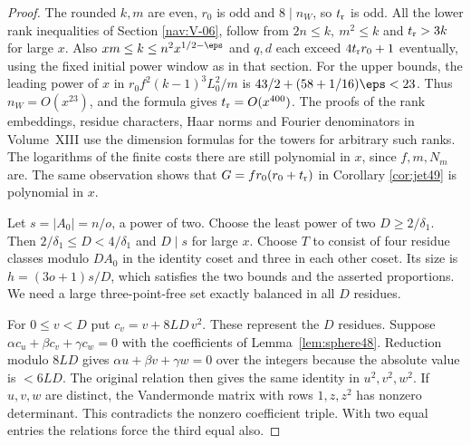 \documentclass[a4paper,11pt]{article}
\theoremstyle{definition}
\theoremstyle{remark}
\numberwithin{equation}{section}
\begin{document}
\begin{proof}
The rounded \(k,m\) are even, \(r_0\) is odd and \(8\mid n_W\), so
\(t_{\rm r}\) is odd. All the lower rank inequalities of Section \ref{nav:V-06}, follow from \(2n\le k,\ m^2\le k\) and
\(t_{\rm r}>3k\) for large \(x\). Also
\(xm\le k\le n^2x^{1/2-\eps}\) and \(q,d\) each exceed
\(4t_{\rm r}r_0+1\) eventually, using the fixed initial power window
as in that section. For the upper bounds, the leading power of \(x\)
in \(r_0 f^2(k-1)^3L_0^2/m\) is
\(43/2+(58+1/16)\eps<23\). Thus \(n_W=O(x^{23})\), and the
formula gives \(t_{\rm r}=O(x^{400})\). The proofs of the rank
embeddings, residue characters, Haar norms and Fourier denominators
in Volume~XIII use the dimension formulas for the towers for arbitrary
such ranks. The logarithms of the finite costs there are still
polynomial in \(x\), since \(f,m,N_m\) are. The same observation shows
that \(G=f r_0(r_0+t_{\rm r})\) in
Corollary \ref{cor:jet49}
is polynomial in \(x\).

Let \(s=|A_0|=n/o\), a power of two. Choose the least power of two
\(D\ge2/\delta_1\). Then \(2/\delta_1\le D<4/\delta_1\) and \(D\mid s\)
for large \(x\). Choose \(T\) to consist of four residue classes modulo
\(DA_0\) in the identity coset and three in each other coset. Its size
is \(h=(3o+1)s/D\), which satisfies the two bounds and the asserted
proportions. We need a large three-point-free set exactly balanced
in all \(D\) residues.

For \(0\le v<D\) put \(c_v=v+8LD\,v^2\). These represent the \(D\)
residues. Suppose \(\alpha c_u+\beta c_v+\gamma c_w=0\) with the
coefficients of Lemma~\ref{lem:sphere48}. Reduction modulo \(8LD\)
gives \(\alpha u+\beta v+\gamma w=0\) over the integers because
the absolute value is \(<6LD\). The original relation then gives the
same identity in \(u^2,v^2,w^2\). If \(u,v,w\) are distinct, the
Vandermonde matrix with rows \(1,z,z^2\) has nonzero determinant.
This contradicts the nonzero coefficient triple. With two equal
entries the relations force the third equal also.


\end{proof}
\end{document}
